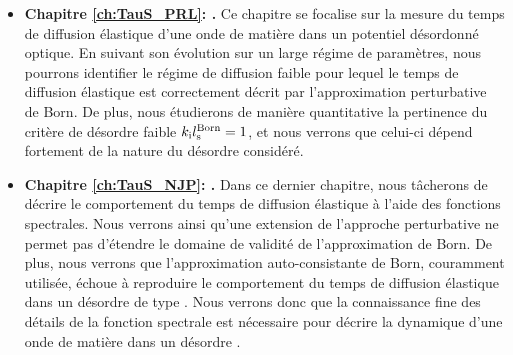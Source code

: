 \begin{itemize}
\item[\textendash] \textbf{Chapitre \ref{ch:TauS_PRL}: {\hypersetup{linkcolor=black}}.} Ce chapitre se focalise sur la mesure du temps de diffusion élastique d'une onde de matière dans un potentiel désordonné optique. En suivant son évolution sur un large régime de paramètres, nous pourrons identifier le régime de diffusion faible pour lequel le temps de diffusion élastique est correctement décrit par l'approximation perturbative de Born. De plus, nous étudierons de manière quantitative la pertinence du critère de désordre faible $k_{\mathrm{i}}l_{\mathrm{s}}^{\mathrm{Born}}=1$, et nous verrons que celui-ci dépend fortement de la nature du désordre considéré. \\

\item[\textendash] \textbf{Chapitre \ref{ch:TauS_NJP}: {\hypersetup{linkcolor=black}}.} Dans ce dernier chapitre, nous tâcherons de décrire le comportement du temps de diffusion élastique à l'aide des fonctions spectrales. Nous verrons ainsi qu'une extension de l'approche perturbative ne permet pas d'étendre le domaine de validité de l'approximation de Born. De plus, nous verrons que l'approximation auto-consistante de Born, couramment utilisée, échoue à reproduire le comportement du temps de diffusion élastique dans un désordre de type \speckle . Nous verrons donc que la connaissance fine des détails de la fonction spectrale est nécessaire pour décrire la dynamique d'une onde de matière dans un désordre \speckle .
\end{itemize}


